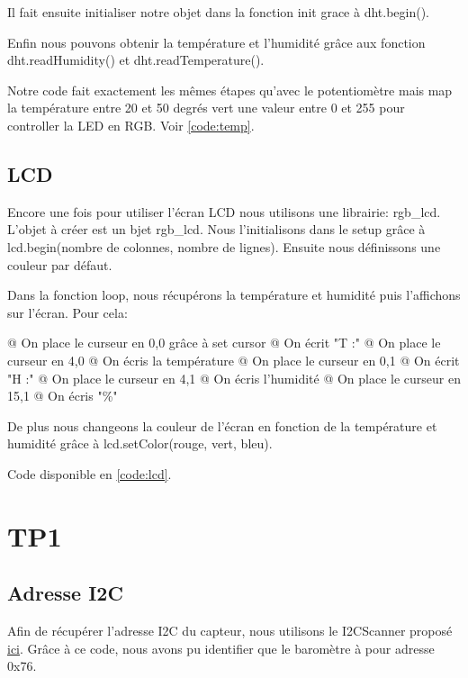 \documentclass{report}
\begin{document}
  			Il fait ensuite initialiser notre objet dans la fonction init grace à dht.begin().
  			
  			Enfin nous pouvons obtenir la température et l'humidité grâce aux fonction dht.readHumidity() et dht.readTemperature().
  			
  			Notre code fait exactement les mêmes étapes qu'avec le potentiomètre mais map la température entre 20 et 50 degrés vert une valeur entre 0 et 255 pour controller la LED en RGB.
  			Voir \autoref{code:temp}.
  			
  		\section{LCD}
  			Encore une fois pour utiliser l'écran LCD nous utilisons une librairie: rgb\_lcd.
  			L'objet à créer est un bjet rgb\_lcd.
  			Nous l'initialisons dans le setup grâce à lcd.begin(nombre de colonnes, nombre de lignes).
  			Ensuite nous définissons une couleur par défaut.
  			
  			Dans la fonction loop, nous récupérons la température et humidité puis l'affichons sur l'écran.
  			Pour cela:
  			\begin{easylist}[itemize]
  				@ On place le curseur en 0,0 grâce à set cursor
  				@ On écrit "T :"
  				@ On place le curseur en 4,0
  				@ On écris la température
  				@ On place le curseur en 0,1
  				@ On écrit "H :"
  				@ On place le curseur en 4,1
  				@ On écris l'humidité
  				@ On place le curseur en 15,1
  				@ On écris "\%"
  			\end{easylist}
  			
  			De plus nous changeons la couleur de l'écran en fonction de la température et humidité grâce à lcd.setColor(rouge, vert, bleu).
  			
  			Code disponible en \autoref{code:lcd}.
  	
  	\chapter{TP1}
  		\section{Adresse I2C}
  			Afin de récupérer l'adresse I2C du capteur, nous utilisons le I2CScanner proposé \href{https://playground.arduino.cc/Main/I2cScanner}{ici}.
  			Grâce à ce code, nous avons pu identifier que le baromètre à pour adresse 0x76.
  			
\end{document}
